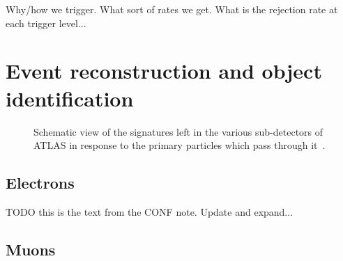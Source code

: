 {\color{red} Why/how we trigger. What sort of rates we get. What is the
rejection rate at each trigger level...}

\FloatBarrier
\section{Event reconstruction and object identification}

\begin{figure}[ht]
  \caption{
    Schematic view of the signatures left in the various sub-detectors of ATLAS
    in response to the primary particles which pass through
    it~\cite{Pequenao:1505342}.
  }
  \label{fig:particle_signatures}
\end{figure}

\FloatBarrier
\subsection{Electrons} 
\label{sec:elctrons}

{\color{red} TODO this is the text from the CONF note. Update and expand...}

\FloatBarrier
\subsection{Muons} 
\label{sec:muons}

